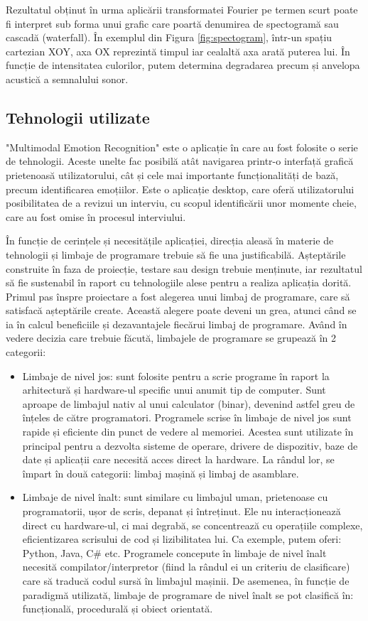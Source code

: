 \documentclass[a4paper, 12pt]{report}
\begin{document}
	Rezultatul obținut în urma aplicării transformatei Fourier pe termen scurt poate fi interpret sub forma unui grafic care poartă denumirea de spectogramă sau cascadă (waterfall). În exemplul din Figura \ref{fig:spectogram}, într-un spațiu cartezian XOY, axa OX reprezintă timpul iar cealaltă axa arată puterea lui. În funcție de intensitatea culorilor, putem determina degradarea precum și anvelopa acustică a semnalului sonor.
	
	\clearpage
	\subsection{Tehnologii utilizate}
	"Multimodal Emotion Recognition" este o aplicație în care au fost folosite o serie de tehnologii. Aceste unelte fac posibilă atât navigarea printr-o interfață grafică prietenoasă utilizatorului, cât și cele mai importante funcționalități de bază, precum identificarea emoțiilor. Este o aplicație desktop, care oferă utilizatorului posibilitatea de a revizui un interviu, cu scopul identificării unor momente cheie, care au fost omise în procesul interviului.
	
	În funcție de cerințele și necesitățile aplicației, direcția aleasă în materie de tehnologii și limbaje de programare trebuie să fie una justificabilă. Așteptările construite în faza de proiecție, testare sau design trebuie menținute, iar rezultatul să fie sustenabil în raport cu tehnologiile alese pentru a realiza aplicația dorită. Primul pas înspre proiectare a fost alegerea unui limbaj de programare, care să satisfacă așteptările create. Această alegere poate deveni un grea, atunci când se ia în calcul beneficiile și dezavantajele fiecărui limbaj de programare. Având în vedere decizia care trebuie făcută, limbajele de programare se grupează în 2 categorii:
	\begin{itemize}
		\item Limbaje de nivel jos: sunt folosite pentru a scrie programe în raport la arhitectură și hardware-ul specific unui anumit tip de computer. Sunt aproape de limbajul nativ al unui calculator (binar), devenind astfel greu de înțeles de către programatori.
		Programele scrise în limbaje de nivel jos sunt rapide și eficiente din punct de vedere al memoriei. Acestea sunt utilizate în principal pentru a dezvolta sisteme de operare, drivere de dispozitiv, baze de date și aplicații care necesită acces direct la hardware. La rândul lor, se împart în două categorii: limbaj mașină și limbaj de asamblare.
		\item Limbaje de nivel înalt: sunt similare cu limbajul uman, prietenoase cu programatorii, ușor de scris, depanat și întreținut. Ele nu interacționează direct cu hardware-ul, ci mai degrabă, se concentrează cu operațiile complexe, eficientizarea scrisului de cod și lizibilitatea lui. Ca exemple, putem oferi: Python, Java, C\# etc. Programele concepute în limbaje de nivel înalt necesită compilator/interpretor (fiind la rândul ei un criteriu de clasificare) care să traducă codul sursă în limbajul mașinii. De asemenea, în funcție de paradigmă utilizată, limbaje de programare de nivel înalt se pot clasifică în: funcțională, procedurală și obiect orientată.
	\end{itemize}
	
\end{document}
